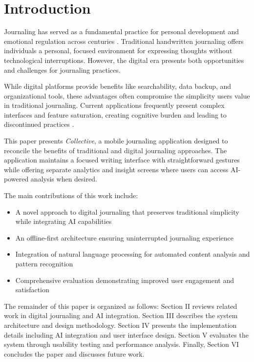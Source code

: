 \documentclass[conference]{IEEEtran}
\begin{document}
\thispagestyle{firstpagefooter}

\section{Introduction}

Journaling has served as a fundamental practice for personal development and emotional regulation across centuries \cite{pennebaker1999forming}. Traditional handwritten journaling offers individuals a personal, focused environment for expressing thoughts without technological interruptions. However, the digital era presents both opportunities and challenges for journaling practices.

While digital platforms provide benefits like searchability, data backup, and organizational tools, these advantages often compromise the simplicity users value in traditional journaling. Current applications frequently present complex interfaces and feature saturation, creating cognitive burden and leading to discontinued practices \cite{sweller1988cognitive}.

This paper presents \textit{Collective}, a mobile journaling application designed to reconcile the benefits of traditional and digital journaling approaches. The application maintains a focused writing interface with straightforward gestures while offering separate analytics and insight screens where users can access AI-powered analysis when desired.

The main contributions of this work include:
\begin{itemize}
\item A novel approach to digital journaling that preserves traditional simplicity while integrating AI capabilities
\item An offline-first architecture ensuring uninterrupted journaling experience
\item Integration of natural language processing for automated content analysis and pattern recognition
\item Comprehensive evaluation demonstrating improved user engagement and satisfaction
\end{itemize}

The remainder of this paper is organized as follows: Section II reviews related work in digital journaling and AI integration. Section III describes the system architecture and design methodology. Section IV presents the implementation details including AI integration and user interface design. Section V evaluates the system through usability testing and performance analysis. Finally, Section VI concludes the paper and discusses future work.
\end{document}
